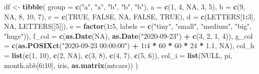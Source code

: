 \documentclass[
]{report}
\newenvironment{Shaded}{\begin{snugshade}}{\end{snugshade}}
\newcommand{\DataTypeTok}[1]{\textcolor[rgb]{0.13,0.29,0.53}{#1}}
\newcommand{\DecValTok}[1]{\textcolor[rgb]{0.00,0.00,0.81}{#1}}
\newcommand{\FloatTok}[1]{\textcolor[rgb]{0.00,0.00,0.81}{#1}}
\newcommand{\KeywordTok}[1]{\textcolor[rgb]{0.13,0.29,0.53}{\textbf{#1}}}
\newcommand{\NormalTok}[1]{#1}
\newcommand{\OperatorTok}[1]{\textcolor[rgb]{0.81,0.36,0.00}{\textbf{#1}}}
\newcommand{\OtherTok}[1]{\textcolor[rgb]{0.56,0.35,0.01}{#1}}
\newcommand{\StringTok}[1]{\textcolor[rgb]{0.31,0.60,0.02}{#1}}
\begin{document}
\begin{Shaded}
\begin{Highlighting}[]
\NormalTok{df \textless{}{-}}\StringTok{ }\KeywordTok{tibble}\NormalTok{(}
  \DataTypeTok{group =} \KeywordTok{c}\NormalTok{(}\StringTok{"a"}\NormalTok{, }\StringTok{"a"}\NormalTok{, }\StringTok{"b"}\NormalTok{, }\StringTok{"b"}\NormalTok{, }\StringTok{"b"}\NormalTok{),}
  \DataTypeTok{a =} \KeywordTok{c}\NormalTok{(}\DecValTok{1}\NormalTok{, }\DecValTok{4}\NormalTok{, }\OtherTok{NA}\NormalTok{, }\DecValTok{3}\NormalTok{, }\DecValTok{5}\NormalTok{),}
  \DataTypeTok{b =} \KeywordTok{c}\NormalTok{(}\DecValTok{9}\NormalTok{, }\OtherTok{NA}\NormalTok{, }\DecValTok{8}\NormalTok{, }\DecValTok{10}\NormalTok{, }\DecValTok{7}\NormalTok{),}
  \DataTypeTok{c =} \KeywordTok{c}\NormalTok{(}\OtherTok{TRUE}\NormalTok{, }\OtherTok{FALSE}\NormalTok{, }\OtherTok{NA}\NormalTok{, }\OtherTok{FALSE}\NormalTok{, }\OtherTok{TRUE}\NormalTok{),}
  \DataTypeTok{d =} \KeywordTok{c}\NormalTok{(LETTERS[}\DecValTok{1}\OperatorTok{:}\DecValTok{3}\NormalTok{], }\OtherTok{NA}\NormalTok{, LETTERS[[}\DecValTok{5}\NormalTok{]]),}
  \DataTypeTok{e =} \KeywordTok{factor}\NormalTok{(}\DecValTok{1}\OperatorTok{:}\DecValTok{5}\NormalTok{, }\DataTypeTok{labels =} \KeywordTok{c}\NormalTok{(}\StringTok{"tiny"}\NormalTok{, }\StringTok{"small"}\NormalTok{, }\StringTok{"medium"}\NormalTok{, }\StringTok{"big"}\NormalTok{, }\StringTok{"huge"}\NormalTok{)),}
  \DataTypeTok{f\_col =} \KeywordTok{c}\NormalTok{(}\KeywordTok{as.Date}\NormalTok{(}\OtherTok{NA}\NormalTok{), }\KeywordTok{as.Date}\NormalTok{(}\StringTok{"2020{-}09{-}23"}\NormalTok{) }\OperatorTok{+}\StringTok{ }\KeywordTok{c}\NormalTok{(}\DecValTok{3}\NormalTok{, }\DecValTok{2}\NormalTok{, }\DecValTok{1}\NormalTok{, }\DecValTok{4}\NormalTok{)),}
  \DataTypeTok{g\_col =} \KeywordTok{c}\NormalTok{(}\KeywordTok{as.POSIXct}\NormalTok{(}\StringTok{"2020{-}09{-}23 00:00:00"}\NormalTok{) }\OperatorTok{+}\StringTok{ }\DecValTok{1}\OperatorTok{:}\DecValTok{4} \OperatorTok{*}\StringTok{ }\DecValTok{60} \OperatorTok{*}\StringTok{ }\DecValTok{60} \OperatorTok{*}\StringTok{ }\DecValTok{24} \OperatorTok{*}\StringTok{ }\FloatTok{1.1}\NormalTok{, }\OtherTok{NA}\NormalTok{),}
  \DataTypeTok{col\_h =} \KeywordTok{list}\NormalTok{(}\KeywordTok{c}\NormalTok{(}\DecValTok{1}\NormalTok{, }\DecValTok{10}\NormalTok{), }\KeywordTok{c}\NormalTok{(}\DecValTok{2}\NormalTok{, }\OtherTok{NA}\NormalTok{), }\KeywordTok{c}\NormalTok{(}\DecValTok{3}\NormalTok{, }\DecValTok{8}\NormalTok{), }\KeywordTok{c}\NormalTok{(}\DecValTok{4}\NormalTok{, }\DecValTok{7}\NormalTok{), }\KeywordTok{c}\NormalTok{(}\DecValTok{5}\NormalTok{, }\DecValTok{6}\NormalTok{)),}
  \DataTypeTok{col\_i =} \KeywordTok{list}\NormalTok{(}\OtherTok{NULL}\NormalTok{, pi, month.abb[}\DecValTok{6}\OperatorTok{:}\DecValTok{10}\NormalTok{], iris, }\KeywordTok{as.matrix}\NormalTok{(mtcars))}
\NormalTok{)}


\end{Highlighting}
\end{Shaded}
\end{document}
